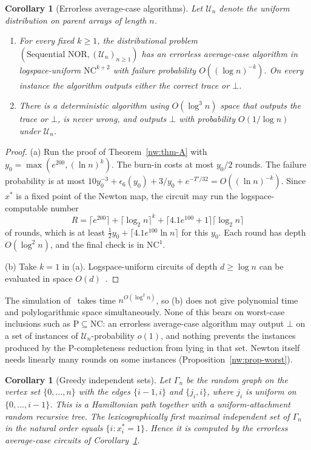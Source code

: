\documentclass[11pt]{amsart}
\newtheorem{corollary}[theorem]{Corollary}
\theoremstyle{definition}
\theoremstyle{remark}
\begin{document}
\begin{corollary}[Errorless average-case algorithms]\label{nw:cor-classes}
Let $\mathcal U_n$ denote the uniform distribution on parent arrays of
length $n$.
\begin{enumerate}[label=\textup{(\alph*)},leftmargin=*]
\item For every fixed $k\ge1$, the distributional problem
  $(\text{Sequential NOR},(\mathcal U_n)_{n\ge1})$ has an errorless
  average-case algorithm in logspace-uniform $\mathrm{NC}^{k+2}$ with failure
  probability $O((\log n)^{-k})$. On every instance the algorithm outputs
  either the correct trace or $\bot$.
\item There is a deterministic algorithm using $O(\log^3n)$ space that outputs
  the trace or $\bot$, is never wrong, and outputs $\bot$ with probability
  $O(1/\log n)$ under $\mathcal U_n$.
\end{enumerate}
\end{corollary}

\begin{proof}
(a) Run the proof of Theorem~\ref{nw:thm-A} with
$y_0=\max(e^{200},(\ln n)^k)$. The burn-in costs at most $y_0/2$ rounds. The
failure probability is at most
$10y_0^{-3}+\epsilon_6(y_0)+3/y_0+e^{-T'/32}=O((\ln n)^{-k})$. Since $x^*$ is
a fixed point of the Newton map, the circuit may run the logspace-computable
number
\[
  R=\lceil e^{200}\rceil+\lceil\log_2n\rceil^k
  +\lceil4.1e^{100}+1\rceil\lceil\log_2n\rceil
\]
of rounds, which is at least $\frac12y_0+\lceil4.1e^{100}\ln n\rceil$ for
this $y_0$. Each round has depth $O(\log^2n)$, and the final check is in
$\mathrm{NC}^1$.

(b) Take $k=1$ in (a). Logspace-uniform circuits of depth $d\ge\log n$ can be
evaluated in space $O(d)$~\cite{kp-borodin}.
\end{proof}

The simulation of~\cite{kp-borodin} takes time $n^{O(\log^2 n)}$, so (b)
does not give polynomial time and polylogarithmic space simultaneously. None of
this bears on worst-case inclusions such as $\mathrm P\subseteq\mathrm{NC}$:
an errorless average-case algorithm may output $\bot$ on a set of instances of
$\mathcal U_n$-probability $o(1)$, and nothing prevents the instances produced
by the P-completeness reduction from lying in that set. Newton itself needs
linearly many rounds on some instances (Proposition~\ref{nw:prop-worst}).

\begin{corollary}[Greedy independent sets]\label{nw:cor-lfmis}
Let $\Gamma_n$ be the random graph on the vertex set $\{0,\dots,n\}$ with
the edges $\{i-1,i\}$ and $\{j_i,i\}$, where $j_i$ is uniform on $\{0,\dots,i-1\}$. This is a
Hamiltonian path together with a uniform-attachment random recursive tree. The
lexicographically first maximal independent set of $\Gamma_n$ in the natural
order equals $\{i:x^*_i=1\}$. Hence it is computed by the errorless
average-case circuits of Corollary~\ref{nw:cor-classes}.
\end{corollary}
\end{document}
